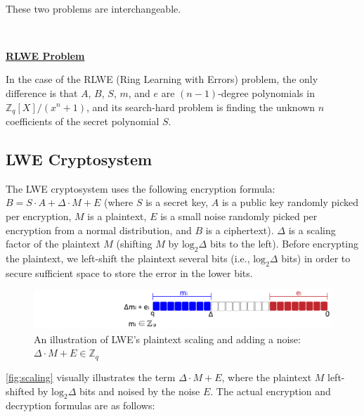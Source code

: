\begin{tcolorbox}[title={\textbf{\tboxlabel{\ref*{subsec:lattice-overview}} The LWE (Learning with Errors) and RLWE Problems}}]
$ $

These two problems are interchangeable.

$ $

\textbf{\underline{RLWE Problem}}

In the case of the RLWE (Ring Learning with Errors) problem, the only difference is that $A$, $B$, $S$, $m$, and $e$ are $(n-1)$-degree polynomials in $\mathbb{Z}_q[X] / (x^n + 1)$, and its search-hard problem is finding the unknown $n$ coefficients of the secret polynomial $S$. 

\end{tcolorbox}




\subsection{LWE Cryptosystem}
\label{subsec:lattice-scheme}

The LWE cryptosystem uses the following encryption formula: $B = S \cdot A + \Delta \cdot M + E$ (where $S$ is a secret key, $A$ is a public key randomly picked per encryption, $M$ is a plaintext, $E$ is a small noise randomly picked per encryption from a normal distribution, and $B$ is a ciphertext). $\Delta$ is a scaling factor of the plaintext $M$ (shifting $M$ by $\text{log}_2\Delta$ bits to the left). Before encrypting the plaintext, we left-shift the plaintext several bits (i.e., $\text{log}_2\Delta$ bits) in order to secure sufficient space to store the error in the lower bits.

\begin{figure}[h!]
    \centering
  \includegraphics[width=0.8\linewidth]{figures/TFHE-fig1.pdf}
  \caption{An illustration of LWE's plaintext scaling and adding a noise: $\Delta \cdot M + E \in \mathbb{Z}_q$}
  \label{fig:scaling}
\end{figure}

\autoref{fig:scaling} visually illustrates the term $\Delta \cdot M + E$, where the plaintext $M$ left-shifted by $\text{log}_2\Delta$ bits and noised by the noise $E$. The actual encryption and decryption formulas are as follows:

